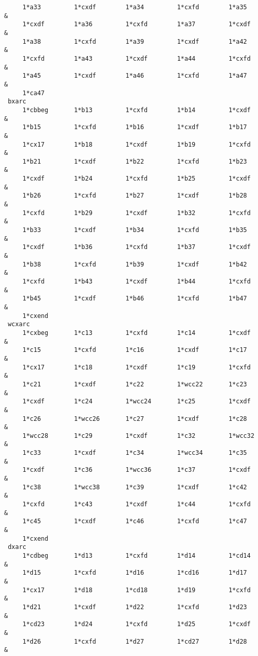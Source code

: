 \begin{footnotesize}
\begin{verbatim}
     1*a33         1*cxdf        1*a34         1*cxfd        1*a35      &
     1*cxdf        1*a36         1*cxfd        1*a37         1*cxdf     &
     1*a38         1*cxfd        1*a39         1*cxdf        1*a42      &
     1*cxfd        1*a43         1*cxdf        1*a44         1*cxfd     &
     1*a45         1*cxdf        1*a46         1*cxfd        1*a47      &
     1*ca47
 bxarc
     1*cbbeg       1*b13         1*cxfd        1*b14         1*cxdf     &
     1*b15         1*cxfd        1*b16         1*cxdf        1*b17      &
     1*cx17        1*b18         1*cxdf        1*b19         1*cxfd     &
     1*b21         1*cxdf        1*b22         1*cxfd        1*b23      &
     1*cxdf        1*b24         1*cxfd        1*b25         1*cxdf     &
     1*b26         1*cxfd        1*b27         1*cxdf        1*b28      &
     1*cxfd        1*b29         1*cxdf        1*b32         1*cxfd     &
     1*b33         1*cxdf        1*b34         1*cxfd        1*b35      &
     1*cxdf        1*b36         1*cxfd        1*b37         1*cxdf     &
     1*b38         1*cxfd        1*b39         1*cxdf        1*b42      &
     1*cxfd        1*b43         1*cxdf        1*b44         1*cxfd     &
     1*b45         1*cxdf        1*b46         1*cxfd        1*b47      &
     1*cxend
 wcxarc
     1*cxbeg       1*c13         1*cxfd        1*c14         1*cxdf     &
     1*c15         1*cxfd        1*c16         1*cxdf        1*c17      &
     1*cx17        1*c18         1*cxdf        1*c19         1*cxfd     &
     1*c21         1*cxdf        1*c22         1*wcc22       1*c23      &
     1*cxdf        1*c24         1*wcc24       1*c25         1*cxdf     &
     1*c26         1*wcc26       1*c27         1*cxdf        1*c28      &
     1*wcc28       1*c29         1*cxdf        1*c32         1*wcc32    &
     1*c33         1*cxdf        1*c34         1*wcc34       1*c35      &
     1*cxdf        1*c36         1*wcc36       1*c37         1*cxdf     &
     1*c38         1*wcc38       1*c39         1*cxdf        1*c42      &
     1*cxfd        1*c43         1*cxdf        1*c44         1*cxfd     &
     1*c45         1*cxdf        1*c46         1*cxfd        1*c47      &
     1*cxend
 dxarc
     1*cdbeg       1*d13         1*cxfd        1*d14         1*cd14     &
     1*d15         1*cxfd        1*d16         1*cd16        1*d17      &
     1*cx17        1*d18         1*cd18        1*d19         1*cxfd     &
     1*d21         1*cxdf        1*d22         1*cxfd        1*d23      &
     1*cd23        1*d24         1*cxfd        1*d25         1*cxdf     &
     1*d26         1*cxfd        1*d27         1*cd27        1*d28      &

\end{verbatim}
\end{footnotesize}
